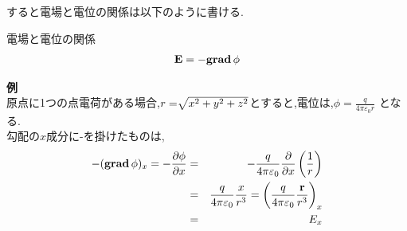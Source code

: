 \documentclass{jsarticle}
\begin{document}
すると電場と電位の関係は以下のように書ける.
\begin{itembox}[c]{電場と電位の関係}
\begin{eqnarray}
{\bf E} = - {\rm{\bf grad}}\, \phi
\end{eqnarray}
\end{itembox}
{\bf 例} \\
原点に1つの点電荷がある場合,$r=\sqrt[]{\mathstrut x^2+y^2+z^2}$とすると,電位は,$\phi=\frac{q}{4 \pi \varepsilon_0 r}$ となる.\\
勾配の$x$成分に-を掛けたものは, \\
\begin{eqnarray}
-({\rm {\bf grad}}\, \phi)_x = - \frac{\partial \phi}{\partial x} &=& -\frac{q}{4 \pi \varepsilon_0} \frac{\partial}{\partial x} \left( \frac{1}{r} \right) \\
&=& \frac{q}{4 \pi \varepsilon_0} \frac{x}{r^3} = \left( \frac{q}{4 \pi \varepsilon_0} \frac{{\bf r}}{r^3} \right)_x \\
&=&E_x
\end{eqnarray}
\end{document}
